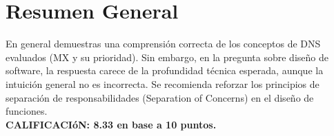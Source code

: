 \documentclass{article}
\begin{document}
\section*{Resumen General}

En general demuestras una comprensión correcta de los conceptos de DNS evaluados (MX y su prioridad). 
Sin embargo, en la pregunta sobre diseño de software, la respuesta carece de la profundidad técnica 
esperada, aunque la intuición general no es incorrecta. Se recomienda reforzar los principios de 
separación de responsabilidades (Separation of Concerns) en el diseño de funciones. \\
\textbf{CALIFICACIóN: 8.33 en base a 10 puntos.}
\end{document}
